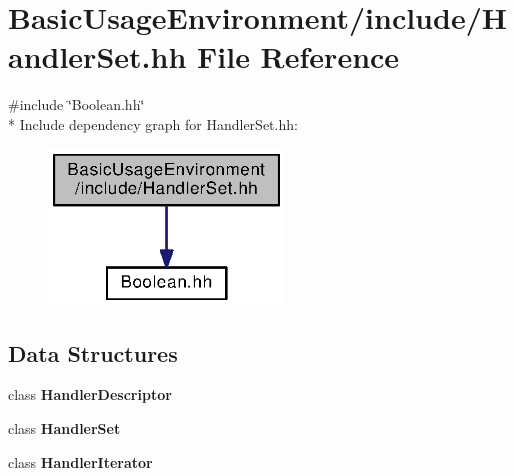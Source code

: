 \section{Basic\+Usage\+Environment/include/\+Handler\+Set.hh File Reference}
\label{HandlerSet_8hh}
{\ttfamily \#include \char`\"{}Boolean.\+hh\char`\"{}}\\*
Include dependency graph for Handler\+Set.\+hh\+:
\nopagebreak
\begin{figure}[H]
\begin{center}
\leavevmode
\includegraphics[width=178pt]{HandlerSet_8hh__incl}
\end{center}
\end{figure}
\subsection*{Data Structures}
\begin{DoxyCompactItemize}
\item 
class {\bf Handler\+Descriptor}
\item 
class {\bf Handler\+Set}
\item 
class {\bf Handler\+Iterator}
\end{DoxyCompactItemize}
